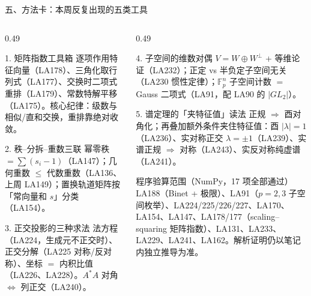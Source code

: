 \documentclass[aspectratio=169,10pt,fontset=none]{ctexbeamer}
\begin{document}
\begin{frame}[t]{五、方法卡：本周反复出现的五类工具}
  \begin{columns}[T,onlytextwidth]
    \begin{column}{0.49\textwidth}
      \begin{block}{\footnotesize 1. 矩阵指数工具箱}
        \scriptsize
        逐项作用特征向量（LA178）、三角化取行列式（LA177）、交换时二项式重排（LA179）、常数特解平移（LA175）。核心纪律：级数与相似/直和交换，重排靠绝对收敛。
      \end{block}
      \begin{block}{\footnotesize 2. 秩--分拆--重数三联}
        \scriptsize
        幂零秩 $=\sum(s_i{-}1)$（LA147）；几何重数 $\le$ 代数重数（LA136、上周 LA149）；置换轨道矩阵按「常向量和 $s$」分类（LA154）。
      \end{block}
      \begin{block}{\footnotesize 3. 正交投影的三种求法}
        \scriptsize
        法方程（LA224，生成元不正交时）、正交分解（LA225 对称/反对称）、坐标 $=$ 内积比值（LA226、LA228）。$A^*A$ 对角 $\iff$ 列正交（LA240）。
      \end{block}
    \end{column}
    \begin{column}{0.49\textwidth}
      \begin{block}{\footnotesize 4. 子空间的维数对偶}
        \scriptsize
        $V=W\oplus W^\perp$ + 等维论证（LA232）；正定 vs 半负定子空间无关（LA230 惯性定律）；$\mathbb F_p^n$ 子空间计数 $=$ Gauss 二项式（LA91，配 LA90 的 $|GL_2|$）。
      \end{block}
      \begin{block}{\footnotesize 5. 谱定理的「夹特征值」读法}
        \scriptsize
        正规 $\Rightarrow$ 酉对角化；再叠加额外条件夹住特征值：酉 $|\lambda|=1$（LA236）、实对称正交 $\lambda=\pm1$（LA239）、实谱正规 $\Rightarrow$ 对称（LA243）、实反对称纯虚谱（LA241）。
      \end{block}
      \begin{exampleblock}{\footnotesize 程序验算范围（NumPy，17 项全部通过）}
        \scriptsize
        LA188（Binet + 极限）、LA91（$p=2,3$ 子空间枚举）、LA224/225/226/227、LA170、LA154、LA147、LA178/177（scaling--squaring 矩阵指数）、LA131、LA233、LA229、LA241、LA162。解析证明仍以笔记内独立推导为准。
      \end{exampleblock}
    \end{column}
  \end{columns}
\end{frame}
\end{document}
